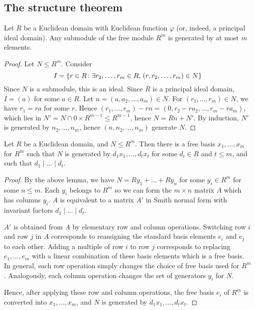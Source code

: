 \subsection{The structure theorem}
\begin{lemma}
	Let \( R \) be a Euclidean domain with Euclidean function \( \varphi \) (or, indeed, a principal ideal domain).
	Any submodule of the free module \( R^m \) is generated by at most \( m \) elements.
\end{lemma}
\begin{proof}
	Let \( N \leq R^m \).
	Consider
	\[ I = \qty{r \in R \colon \exists r_2, \dots, r_m \in R,\, (r,r_2, \dots, r_m) \in N} \]
	Since \( N \) is a submodule, this is an ideal.
	Since \( R \) is a principal ideal domain, \( I = (a) \) for some \( a \in R \).
	Let \( n = (a, a_2, \dots, a_m) \in N \).
	For \( (r_1, \dots, r_m) \in N \), we have \( r_1 = ra \) for some \( r \).
	Hence \( (r_1, \dots, r_m) - rn = (0,r_2 - ra_2, \dots, r_m - ra_m) \), which lies in \( N' = N \cap \qty{0} \times R^{m-1} \leq R^{m-1} \), hence \( N = Rn + N' \).
	By induction, \( N' \) is generated by \( n_2, \dots, n_m \), hence \( (n, n_2, \dots, n_m) \) generate \( N \).
\end{proof}
\begin{theorem}
	Let \( R \) be a Euclidean domain, and \( N \leq R^m \).
	Then there is a free basis \( x_1, \dots, x_m \) for \( R^m \) such that \( N \) is generated by \( d_1 x_1, \dots, d_t x_t \) for some \( d_i \in R \) and \( t \leq m \), and such that \( d_1 \mid \dots \mid d_t \).
\end{theorem}
\begin{proof}
	By the above lemma, we have \( N = R y_1 + \dots + R y_n \) for some \( y_i \in R^m \) for some \( n \leq m \).
	Each \( y_i \) belongs to \( R^m \) so we can form the \( m \times n \) matrix \( A \) which has columns \( y_i \).
	\( A \) is equivalent to a matrix \( A' \) in Smith normal form with invariant factors \( d_1 \mid \dots \mid d_t \).

	\( A' \) is obtained from \( A \) by elementary row and column operations.
	Switching row \( i \) and row \( j \) in \( A \) corresponds to reassigning the standard basis elements \( e_i \) and \( e_j \) to each other.
	Adding a multiple of row \( i \) to row \( j \) corresponds to replacing \( e_1, \dots, e_m \) with a linear combination of these basis elements which is a free basis.
	In general, each row operation simply changes the choice of free basis used for \( R^m \).
	Analogously, each column operation changes the set of generators \( y_i \) for \( N \).

	Hence, after applying these row and column operations, the free basis \( e_i \) of \( R^m \) is converted into \( x_1, \dots, x_m \), and \( N \) is generated by \( d_1 x_1, \dots, d_t x_t \).
\end{proof}
